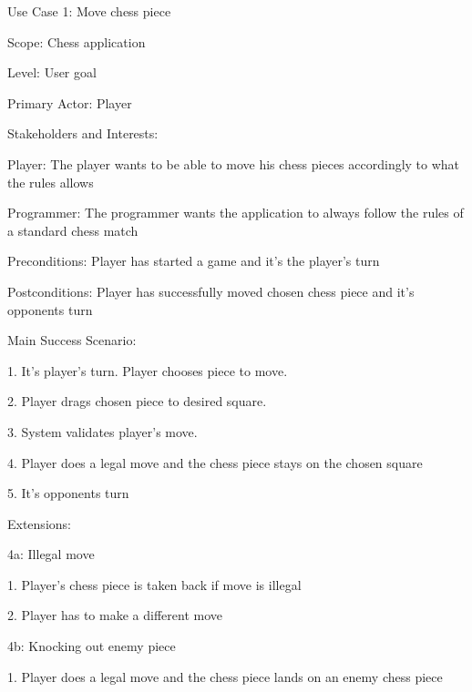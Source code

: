 \documentclass[letterpaper,11pt]{article}
\begin{document}
\begin{list}{}{}
	\item Use Case 1: Move chess piece
	\item Scope: Chess application
	\item Level: User goal
	\item Primary Actor: Player
	\item Stakeholders and Interests:
	\item \begin{list}{}{}
			\item Player: The player wants to be able to move his chess pieces accordingly to what the rules allows
			\item Programmer: The programmer wants the application to always follow the rules of a standard chess match
		\end{list}
	\item Preconditions: Player has started a game and it's the player's turn
	\item Postconditions: Player has successfully moved chosen chess piece and it's opponents turn
	\item Main Success Scenario:
	\item \begin{list}{}{}
			\item 1. It's player's turn. Player chooses piece to move.
			\item 2. Player drags chosen piece to desired square.
			\item 3. System validates player's move.
			\item 4. Player does a legal move and the chess piece stays on the chosen square
			\item 5. It's opponents turn
		\end{list}
	\item	Extensions:
	\item \begin{list}{}{}
			\item 4a: Illegal move
			\item \begin{list}{}{}
					\item 1. Player's chess piece is taken back if move is illegal
					\item 2. Player has to make a different move
				\end{list}
			\item 4b: Knocking out enemy piece
			\item \begin{list}{}{}
					\item 1. Player does a legal move and the chess piece lands on an enemy chess piece

\end{list}
\end{list}
\end{list}
\end{document}
